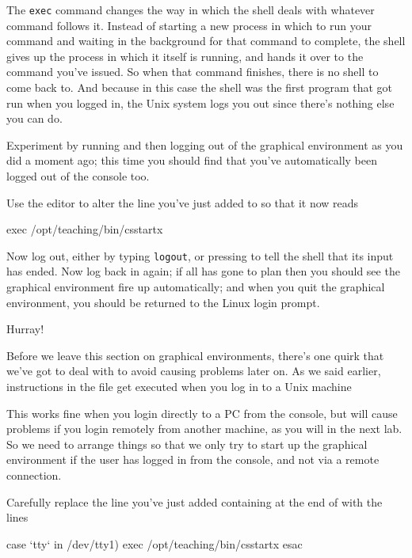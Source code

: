 The \texttt{exec} command changes the way in which the shell deals with whatever command follows it. Instead of starting a new process in which to run your command and waiting in the background for that command to complete, the shell gives up the process in which it itself is running, and hands it over to the command you've issued. So when that command finishes, there is no shell to come back to. And because in this case the shell was the first program that got run when you logged in, the Unix system logs you out since there's nothing else you can do. 

Experiment by running  and then logging out of the graphical environment as you did a moment ago; this time you should find that you've automatically been logged out of the console too.

Use the  editor to alter the line you've just added to  so that it now reads 

\begin{ttoutenv}
exec /opt/teaching/bin/csstartx
\end{ttoutenv}

Now log out, either by typing \texttt{logout},  or  pressing  to tell the shell that its input has ended. Now log back in again; if all has gone to plan then you should see the graphical environment fire up automatically; and when you quit the graphical environment, you should be returned to the Linux login prompt. 

Hurray!

Before we leave this section on graphical environments, there's one quirk that we've got to deal with to avoid causing problems later on. As we said earlier, instructions in the  file get executed when you log in to a Unix machine

This works fine when you login directly to a PC from the console, but will cause problems if you login remotely from another machine, as you will in the next lab. So we need to arrange things so that we only try to start up the graphical environment if the user has logged in from the console, and not via a remote connection. 

Carefully replace the line you've just added containing  at the end of  with the lines

\begin{ttoutenv}
case `tty` in
/dev/tty1) exec /opt/teaching/bin/csstartx
esac 
\end{ttoutenv}

